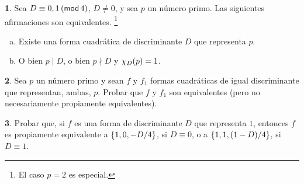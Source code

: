 \theoremstyle{definition}
\newtheorem{ejerRepresentaciones}{\ejername}[section]


\begin{ejerRepresentaciones}\label{ejer:representaciones:kronecker}
	Sea $D\equiv 0,1\tmodulo[4]$, $D\neq 0$, y sea $p$
	un n\'umero primo. Las siguientes afirmaciones
	son equivalentes.%
	\footnote{
		El caso $p=2$ es especial.
	}
	\begin{enumerate}[(a)]
		\item\label{item:ejer:representaciones:kronecker:representable}
			Existe una forma cuadr\'atica de discriminante
			$D$ que representa $p$.
		\item\label{item:ejer:representaciones:kronecker:nucleo}
			O bien $p\mid D$, o bien $p\nmid D$ y
			$\varkronecker[D](p)=1$.
	\end{enumerate}
\end{ejerRepresentaciones}

\begin{ejerRepresentaciones}\label{ejer:representaciones:equivalentes:primo}
	Sea $p$ un n\'umero primo y sean $f$ y $f_1$ formas
	cuadr\'aticas de igual discriminante que representan,
	ambas, $p$. Probar que $f$ y $f_1$ son equivalentes
	(pero no necesariamente propiamente equivalentes).
\end{ejerRepresentaciones}

\begin{ejerRepresentaciones}\label{ejer:representaciones:equivalentes:uno}
	Probar que, si $f$ es una forma de discriminante $D$ que
	representa $1$, entonces $f$ es propiamente equivalente a
	$\binaria{1,0,-D/4}$, si $D\equiv 0$, o a
	$\binaria{1,1,(1-D)/4}$, si $D\equiv 1$.%
\end{ejerRepresentaciones}

